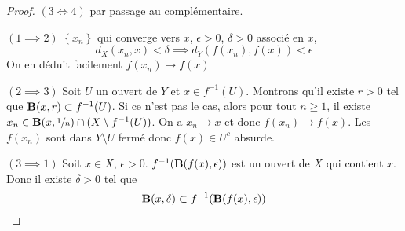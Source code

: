 \begin{proof}
    $(3 \iff  4)$ par passage au complémentaire.

    $(1 \implies 2)$  $ \left\{ x_n \right\} $ qui converge vers $x$,  $\epsilon>0$,  $\delta>0$ associé en  $x$,  \[
        d_X(x_n, x)<\delta \implies  d_Y(f(x_n), f(x))<\epsilon
    \] 
    On en déduit facilement $f(x_n)\longrightarrow f(x)$

    $(2 \implies 3)$ Soit $U$ un ouvert de  $Y$ et  $x \in  f^{-1}(U)$. Montrons qu'il existe $r>0$ tel que  $\mathbf B(x, r)\subset f^{-1}(U)$. Si ce n'est pas le cas, alors pour tout $n\geq 1$, il existe $x_n \in  \mathbf B(x, \sfrac 1n)\cap (X\setminus f^{-1} (U))$. On a $x_n \to  x$ et donc $f(x_n) \to  f(x)$. Les $f(x_n)$ sont dans  $Y\setminus U$ fermé donc $f(x) \in  U^c$ absurde.

    $(3 \implies 1)$ Soit $x \in  X$, $\epsilon>0$. $f^{-1}(\mathbf B(f(x), \epsilon))$ est un ouvert de $X$ qui contient  $x$. Donc il existe  $\delta>0$ tel que  \[
        \mathbf B(x, \delta) \subset f^{-1}(\mathbf B(f(x), \epsilon))
    \] 
\end{proof}
